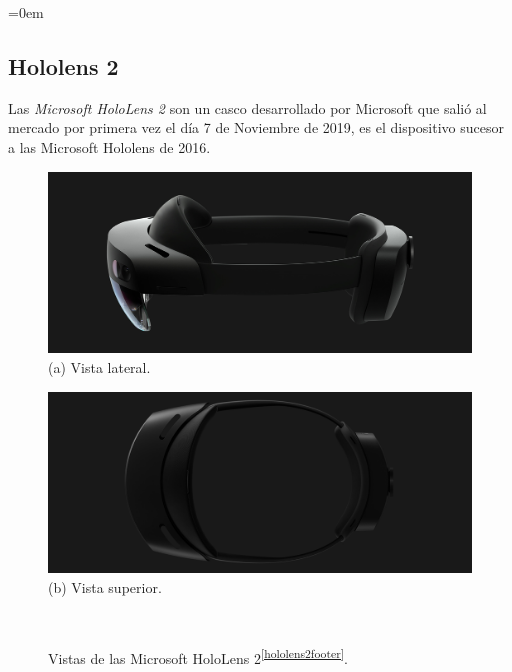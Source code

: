 \parindent=0em
\subsection{Hololens 2}
\label{HoloLens2Dispositivo}
\noindent

Las \textit{Microsoft HoloLens 2} son un casco desarrollado por Microsoft que salió al mercado por primera vez el día 7 de Noviembre de 2019, es el dispositivo sucesor a las Microsoft Hololens de 2016.


\begin{figure}[htbp]
\centering
    \hspace{-4mm}
    \begin{minipage}{0.5\textwidth}
        \centering
        \includegraphics[scale=0.2]{Images/Estado del arte/hololens2_2.jpeg}\\
        (a) Vista lateral.
    \end{minipage}
    \begin{minipage}{0.5\textwidth}
        \centering
        \includegraphics[scale=0.2]{Images/Estado del arte/hololens2_3.jpeg}\\
       (b) Vista superior.
    \end{minipage}\\
    \caption{Vistas de las Microsoft HoloLens 2\textsuperscript{\ref{hololens2footer}}.}
    \label{fig:vistasHoloLens2}
\end{figure}


